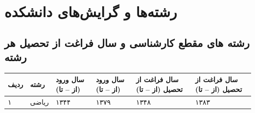 \documentclass[
  letterpaper,
  DIV=11,
  numbers=noendperiod]{scrreprt}
\newcounter{none} %
\begin{document}
\section{رشته‌ها و گرایش‌های
دانشکده}\label{ux631ux634ux62aux647ux647ux627-ux648-ux6afux631ux627ux6ccux634ux647ux627ux6cc-ux62fux627ux646ux634ux6a9ux62fux647}

\subsection{رشته های مقطع کارشناسی و سال فراغت از تحصیل هر
رشته}\label{ux631ux634ux62aux647-ux647ux627ux6cc-ux645ux642ux637ux639-ux6a9ux627ux631ux634ux646ux627ux633ux6cc-ux648-ux633ux627ux644-ux641ux631ux627ux63aux62a-ux627ux632-ux62aux62dux635ux6ccux644-ux647ux631-ux631ux634ux62aux647}

{\def\LTcaptype{none} %
\begin{longtable}[]{@{}
  >{\raggedright\arraybackslash}p{}
  >{\raggedright\arraybackslash}p{}
  >{\raggedright\arraybackslash}p{}
  >{\raggedright\arraybackslash}p{}
  >{\raggedright\arraybackslash}p{}
  >{\raggedright\arraybackslash}p{}@{}}
\toprule\noalign{}
\begin{minipage}[b]{\linewidth}\raggedright
ردیف
\end{minipage} & \begin{minipage}[b]{\linewidth}\raggedright
رشته
\end{minipage} & \begin{minipage}[b]{\linewidth}\raggedright
سال ورود (از -- تا)
\end{minipage} & \begin{minipage}[b]{\linewidth}\raggedright
سال ورود (از -- تا)
\end{minipage} & \begin{minipage}[b]{\linewidth}\raggedright
سال فراغت از تحصیل (از -- تا)
\end{minipage} & \begin{minipage}[b]{\linewidth}\raggedright
سال فراغت از تحصیل (از -- تا)
\end{minipage} \\
\midrule\noalign{}
\endhead
\bottomrule\noalign{}
\endlastfoot
۱ & ریاضی & ۱۳۴۴ & ۱۳۷۹ & ۱۳۴۸ & ۱۳۸۳ \\

\end{longtable}}
\end{document}
